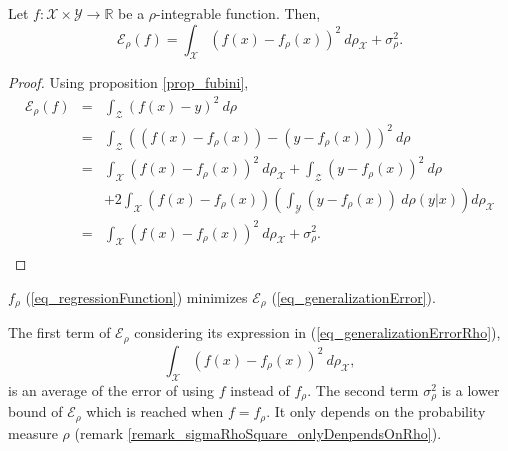 \begin{proposition} \label{prop_generalizationErrorProposition}
  Let $f: \mathcal{X} \times \mathcal{Y} \to \mathbb{R}$ be a $\rho$-integrable function. Then,
  \begin{equation} \label{eq_generalizationErrorRho}
    \mathcal{E}_{\rho}(f) = \int_{\mathcal{X}} (f(x) - f_{\rho}(x))^2 \ d\rho_{\mathcal{X}} + \sigma_{\rho}^2.
  \end{equation}
  \begin{proof} Using proposition \ref{prop_fubini},
  \begin{equation*} \begin{array} {rcl}
    \mathcal{E}_{\rho}(f) &= &\int_{\mathcal{Z}} (f(x)-y)^2 \ d\rho \\ 
                          &= &\int_{\mathcal{Z}} \left((f(x)-f_{\rho}(x))-(y-f_{\rho}(x))\right)^2 \ d\rho \\
                          &= &\int_{\mathcal{X}} (f(x)-f_{\rho}(x))^2 \ d\rho_{\mathcal{X}} + \int_{\mathcal{Z}} (y-f_{\rho}(x))^2 \ d\rho \\
                          &  &+ 2 \int_{\mathcal{X}} (f(x)-f_{\rho}(x)) \left( \int_{\mathcal{Y}} (y-f_{\rho}(x)) \ d\rho(y|x) \right) d\rho_{\mathcal{X}} \\
                          &= &\int_{\mathcal{X}} (f(x) - f_{\rho}(x))^2 \ d\rho_{\mathcal{X}} + \sigma_{\rho}^2. \\
  \end{array} \end{equation*}
  \end{proof}
\end{proposition}

\begin{corollary} \label{corollary_frhoMinimizes}
  $f_{\rho}$ (\ref{eq_regressionFunction}) minimizes $\mathcal{E}_{\rho}$ (\ref{eq_generalizationError}).  
\end{corollary}

The first term of $\mathcal{E}_{\rho}$ considering its expression in (\ref{eq_generalizationErrorRho}),
\begin{equation*}
  \int_{\mathcal{X}} (f(x) - f_{\rho}(x))^2 \ d\rho_{\mathcal{X}},
\end{equation*} 
is an average of the error of using $f$ instead of $f_{\rho}$. The second term $\sigma_{\rho}^2$ is a lower bound of $\mathcal{E}_{\rho}$ which is reached when $f=f_{\rho}$. It only depends on the probability measure $\rho$ (remark \ref{remark_sigmaRhoSquare_onlyDenpendsOnRho}). 

